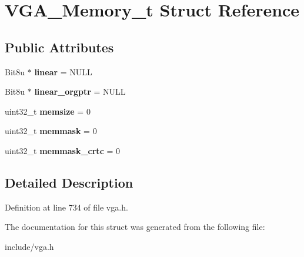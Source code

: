 \hypertarget{structVGA__Memory__t}{\section{V\-G\-A\-\_\-\-Memory\-\_\-t Struct Reference}
\label{structVGA__Memory__t}
}
\subsection*{Public Attributes}
\begin{DoxyCompactItemize}
\item 
\hypertarget{structVGA__Memory__t_a452d09d9155becd538a0b362782ed049}{Bit8u $\ast$ {\bfseries linear} = N\-U\-L\-L}\label{structVGA__Memory__t_a452d09d9155becd538a0b362782ed049}

\item 
\hypertarget{structVGA__Memory__t_a2c3aa74037c772deb9ab0dcdea35df02}{Bit8u $\ast$ {\bfseries linear\-\_\-orgptr} = N\-U\-L\-L}\label{structVGA__Memory__t_a2c3aa74037c772deb9ab0dcdea35df02}

\item 
\hypertarget{structVGA__Memory__t_aedc48ccbffb6aa8cc07c7703d8bbfc7d}{uint32\-\_\-t {\bfseries memsize} = 0}\label{structVGA__Memory__t_aedc48ccbffb6aa8cc07c7703d8bbfc7d}

\item 
\hypertarget{structVGA__Memory__t_af1a5584e712e7a78fe0bdceb55fa9b69}{uint32\-\_\-t {\bfseries memmask} = 0}\label{structVGA__Memory__t_af1a5584e712e7a78fe0bdceb55fa9b69}

\item 
\hypertarget{structVGA__Memory__t_a2ef13fff800afe3013103e33d28e07ce}{uint32\-\_\-t {\bfseries memmask\-\_\-crtc} = 0}\label{structVGA__Memory__t_a2ef13fff800afe3013103e33d28e07ce}

\end{DoxyCompactItemize}


\subsection{Detailed Description}


Definition at line 734 of file vga.\-h.



The documentation for this struct was generated from the following file\-:\begin{DoxyCompactItemize}
\item 
include/vga.\-h\end{DoxyCompactItemize}
